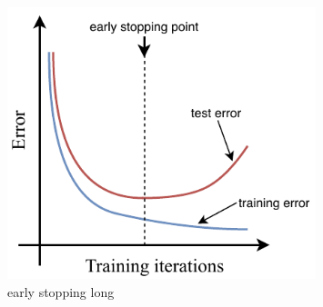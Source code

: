 \begin{figure} %
    \includegraphics[width=0.8\textwidth]{diagrams/6-cvn/early_stopping.pdf}
    \caption[early stopping short]
    {early stopping long}
    \label{fig:early_stopping}
\end{figure} %


